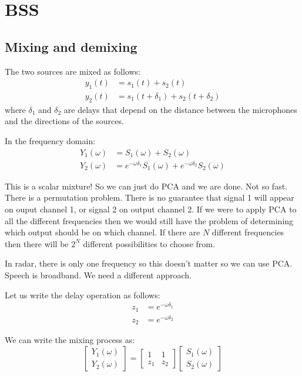 \chapter{BSS}


\section{Mixing and demixing}

The two sources are mixed as follows:
\begin{align}
  y_1(t) & = s_1(t) + s_2(t) \\
  y_2(t) & = s_1(t+\delta_1) + s_2(t+\delta_2)
\end{align}
where $\delta_1$ and $\delta_2$ are delays that depend on the distance
between the microphones and the directions of the sources.


In the frequency domain:
\begin{align}
  Y_1(\omega) & = S_1(\omega) + S_2(\omega) \\
  Y_2(\omega) & = e^{-\omega\delta_1}S_1(\omega) + e^{-\omega\delta_2}S_2(\omega)
\end{align}

This is a scalar mixture! So we can just do PCA and we are done. Not
so fast. There is a permutation problem. There is no guarantee that
signal 1 will appear on ouput channel 1, or signal 2 on output channel
2. If we were to apply PCA to all the different frequencies then we
would still have the problem of determining which output should be on
which channel. If there are $N$ different frequencies then there will
be $2^N$ different possibilities to choose from.

In radar, there is only one frequency so this doesn't matter so we can
use PCA. Speech is broadband. We need a different approach.

Let us write the delay operation as follows:
\begin{align}
  z_1 & =  e^{-\omega\delta_1}\\
  z_2 & =  e^{-\omega\delta_2}
\end{align}

We can write the mixing process as:
\begin{equation}
  \begin{bmatrix}
    Y_1(\omega)\\
    Y_2(\omega)
  \end{bmatrix}
  =
  \begin{bmatrix}
  1 & 1\\
  z_1 & z_2
  \end{bmatrix}
  \begin{bmatrix}
  S_1(\omega)\\
  S_2(\omega)
    \end{bmatrix}
\end{equation}

